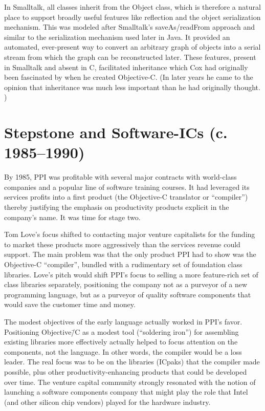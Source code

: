 \documentclass[acmsmall]{acmart}\settopmatter{}
\begin{document}
In Smalltalk, all classes inherit from the Object class, which is therefore a natural place to support broadly useful features like reflection and the object serialization mechanism. This was modeled after Smalltalk's saveAs/readFrom approach and similar to the serialization mechanism used later in Java. It provided an automated, ever-present way to convert an arbitrary graph of objects into a serial stream from which the graph can be reconstructed later. These features, present in Smalltalk and absent in C, facilitated inheritance which Cox had originally been fascinated by when he created Objective-C. (In later years he came to the opinion that inheritance was much less important than he had originally thought. \citetext{\citealp[259]{biancuzzi_objective-c_2009}; \citealp[50--51]{cox_oral_2016}})
\section{Stepstone and Software-ICs (c. 1985--1990)}
\label{sec-stepstone_swIC}
By 1985, PPI was profitable with several major contracts with world-class companies and a popular line of software training courses. It had leveraged its services profits into a first product (the Objective-C translator or ``compiler'') thereby justifying the emphasis on productivity products explicit in the company's name. It was time for stage two.

Tom Love's focus shifted to contacting major venture capitalists for the funding to market these products more aggressively than the services revenue could support. The main problem was that the only product PPI had to show was the Objective-C ``compiler'', bundled with a rudimentary set of foundation class libraries. Love's pitch would shift PPI's focus to selling a more feature-rich set of class libraries separately, positioning the company not as a purveyor of a new programming language, but as a purveyor of quality software components that would save the customer time and money.

The modest objectives of the early language actually worked in PPI's favor. Positioning Objective\=/C as a modest tool (``soldering iron'') for assembling existing libraries more effectively actually helped to focus attention on the components, not the language. In other words, the compiler would be a loss leader. The real focus was to be on the libraries (ICpaks) that the compiler made possible, plus other productivity-enhancing products that could be developed over time. The venture capital community strongly resonated with the notion of launching a software components company that might play the role that Intel (and other silicon chip vendors) played for the hardware industry. 
\end{document}
